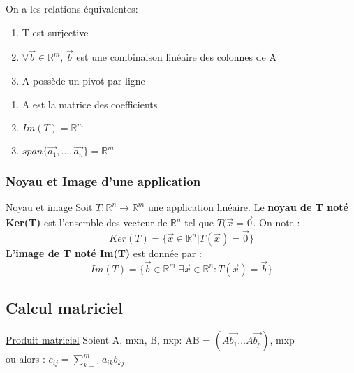 \documentclass[../main.tex]{subfiles}
\begin{document}
On a les relations équivalentes: \\
\begin{minipage}{.5\textwidth}
    \begin{enumerate}
    \item T est surjective\\
    \item $\forall \vec{b} \in \mathbb{R}^m$, $\vec{b}$ est une combinaison linéaire des colonnes de A\\
    \item A possède un pivot par ligne\\
\end{enumerate}
\end{minipage}
\vline
\begin{minipage}{.5\textwidth}
    \begin{enumerate}
        \item A est la matrice des coefficients\\
        \item $Im(T) = \mathbb{R}^m$\\
        \item $span\{\vec{a_1}, \dots,\vec{a_n}\} = \mathbb{R}^m$
    \end{enumerate}
\end{minipage}

\subsubsection{Noyau et Image d'une application}
\quad \underline{Noyau et image}
Soit $T:\mathbb{R}^n \rightarrow \mathbb{R}^m$ une application linéaire. Le \textbf{noyau de T noté Ker(T)} est l'ensemble des vecteur de $\mathbb{R}^n$ tel que $T(\vec{x} = \vec{0}$. On note :
\begin{equation}
    Ker(T) = \{\vec{x} \in \mathbb{R}^n | T(\vec{x}) = \vec{0}\}
\end{equation}
\textbf{L'image de T noté Im(T)} est donnée par :
\begin{equation}
    Im(T) = \{\vec{b} \in \mathbb{R}^m | \exists \vec{x} \in \mathbb{R}^n : T(\vec{x}) = \vec{b} \}
\end{equation}

\subsection{Calcul matriciel}
\quad \underline{Produit matriciel}
Soient A, mxn, B, nxp: AB = $(A\vec{b_1} \dots A\vec{b_p})$, mxp\\
ou alors : $c_{ij} = \sum_{k=1}^m a_{ik} b_{kj}$\\
\end{document}
